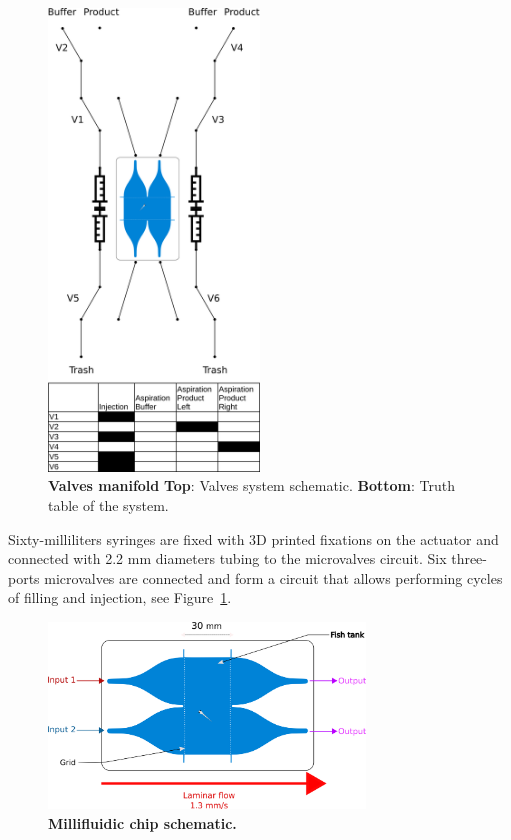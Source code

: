     \begin{figure}[h!]
      \centering
      \includegraphics[width=0.50\textwidth]{part_2/assets/valve_schematic.png}
      \caption{\textbf{Valves manifold} \textbf{Top}: Valves system schematic. \textbf{Bottom}: Truth table of the system.}
      \label{valves_schematic}
    \end{figure}

  Sixty-milliliters syringes are fixed with 3D printed fixations on the actuator and connected with 2.2 mm diameters tubing to the microvalves circuit. Six three-ports microvalves are connected and form a circuit that allows performing cycles of filling and injection, see Figure~\ref{valves_schematic}.

    \begin{figure}[h]
      \centering
      \includegraphics[width=0.75\textwidth]{part_2/assets/chip.png}
      \caption{\textbf{Millifluidic chip schematic.}}
      \label{dual_chip}
    \end{figure}

